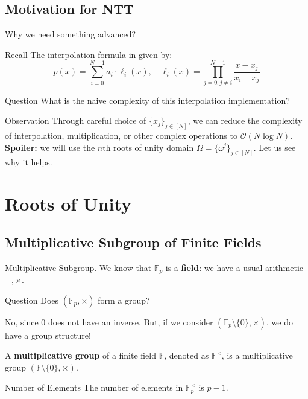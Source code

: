 \documentclass{zkdl-presentation-template}
\begin{document}
    \subsection{Motivation for NTT}
    \begin{frame}{Why we need something advanced?}
        \begin{block}{Recall}
            The interpolation formula in given by:
            \begin{equation*}
                p(x) = \sum_{i=0}^{N-1} a_i \cdot \ell_i(x), \quad \ell_i(x) = \prod_{j=0, j \neq i}^{N-1} \frac{x - x_j}{x_i - x_j}
            \end{equation*}
        \end{block}

        \begin{alertblock}{Question}
            What is the naive complexity of this interpolation implementation?
        \end{alertblock}

        \begin{block}{Observation}
            Through careful choice of $\{x_j\}_{j \in [N]}$, we can reduce the
            complexity of interpolation, multiplication, or other complex
            operations to $\mathcal{O}(N \log N)$. \textbf{Spoiler:} we will use
            the $n$th roots of unity domain $\Omega = \{\omega^j\}_{j \in [N]}$.
            Let us see why it helps.
        \end{block}
    \end{frame}

    \section{Roots of Unity}
    \subsection{Multiplicative Subgroup of Finite Fields}
    \begin{frame}{Multiplicative Subgroup.}
        We know that $\mathbb{F}_p$ is a \textbf{field}: we have a usual arithmetic $+,\times$.

        \begin{alertblock}{Question}
            Does $(\mathbb{F}_p, \times)$ form a group?
        \end{alertblock}

        No, since $0$ does not have an inverse. But, if we consider
        $(\mathbb{F}_p \setminus \{0\}, \times)$, we do have a group structure!

        \begin{definition}
            A \textbf{multiplicative group} of a finite field $\mathbb{F}$, denoted as $\mathbb{F}^{\times}$, is a multiplicative group $(\mathbb{F} \setminus \{0\}, \times)$.
        \end{definition}

        \begin{block}{Number of Elements}
            The number of elements in $\mathbb{F}^{\times}_p$ is $p - 1$. 
        \end{block}
    \end{frame}
\end{document}
